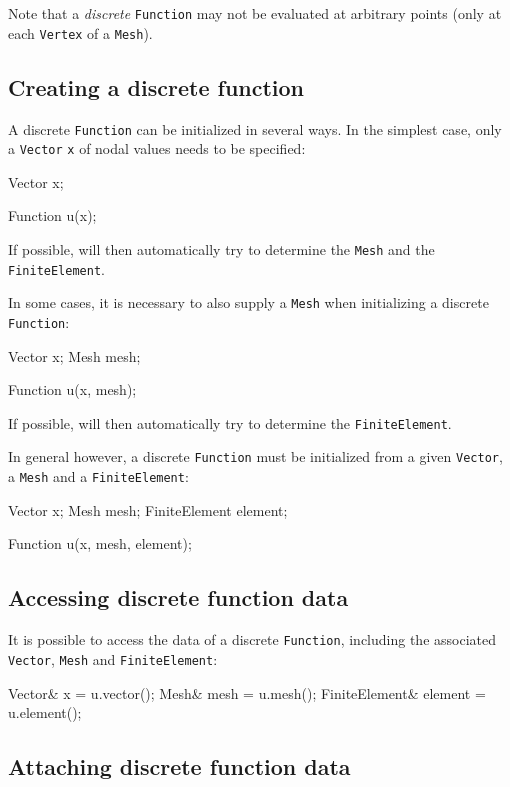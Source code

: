 Note that a \emph{discrete} \texttt{Function} may not be evaluated at
arbitrary points (only at each \texttt{Vertex} of a \texttt{Mesh}).

\subsection{Creating a discrete function}

A discrete \texttt{Function} can be initialized in several ways.
In the simplest case, only a \texttt{Vector} \texttt{x} of nodal
values needs to be specified:
\begin{code}
  Vector x;

  Function u(x);
\end{code}
If possible, \dolfin{} will then automatically try to determine the
\texttt{Mesh} and the \texttt{FiniteElement}.

In some cases, it is necessary to also supply a \texttt{Mesh}
when initializing a discrete \texttt{Function}:
\begin{code}
  Vector x;
  Mesh mesh;

  Function u(x, mesh);
\end{code}
If possible, \dolfin{} will then automatically try to determine the
\texttt{FiniteElement}.

In general however, a discrete \texttt{Function} must be initialized
from a given \texttt{Vector}, a \texttt{Mesh}
and a \texttt{FiniteElement}:
\begin{code}
  Vector x;
  Mesh mesh;
  FiniteElement element;

  Function u(x, mesh, element);
\end{code}

\subsection{Accessing discrete function data}

It is possible to access the data of a discrete \texttt{Function},
including the associated \texttt{Vector}, \texttt{Mesh}
and \texttt{FiniteElement}:
\begin{code}
  Vector& x              = u.vector();
  Mesh& mesh             = u.mesh();
  FiniteElement& element = u.element();
\end{code}

\subsection{Attaching discrete function data}

